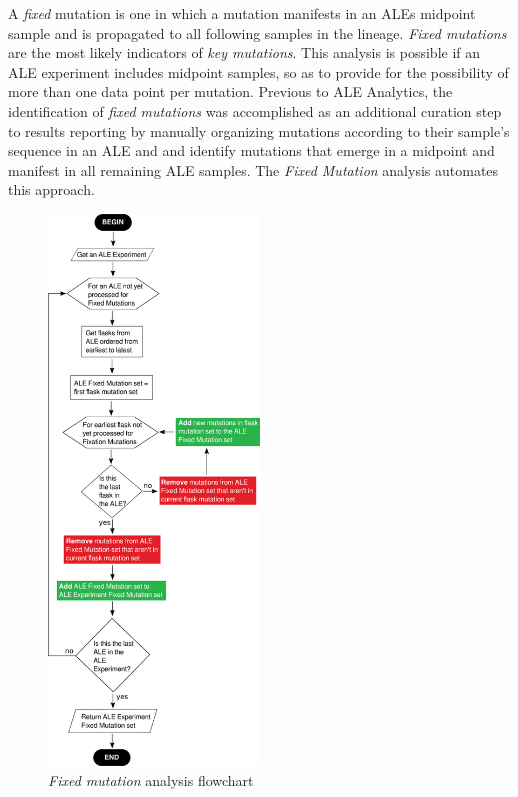 \documentclass[12pt,final,masters,chapterheads]{ucsd}  %
\begin{document}
A \textit{fixed} mutation is one in which a mutation manifests in an ALEs midpoint sample and is propagated to all following samples in the lineage. \textit{Fixed mutations} are the most likely indicators of \textit{key mutations}. This analysis is possible if an ALE experiment includes midpoint samples, so as to provide for the possibility of more than one data point per mutation. Previous to ALE Analytics, the identification of \textit{fixed mutations} was accomplished as an additional curation step to results reporting by manually organizing mutations according to their sample's sequence in an ALE and and identify mutations that emerge in a midpoint and manifest in all remaining ALE samples. The \textit{Fixed Mutation} analysis automates this approach.

\begin{figure}[H]
  \caption{\textit{Fixed mutation} analysis flowchart}
  \centering
  \includegraphics[width=0.50\textwidth]{fixation_mutation_flowchart.png}
\end{figure}
\end{document}
